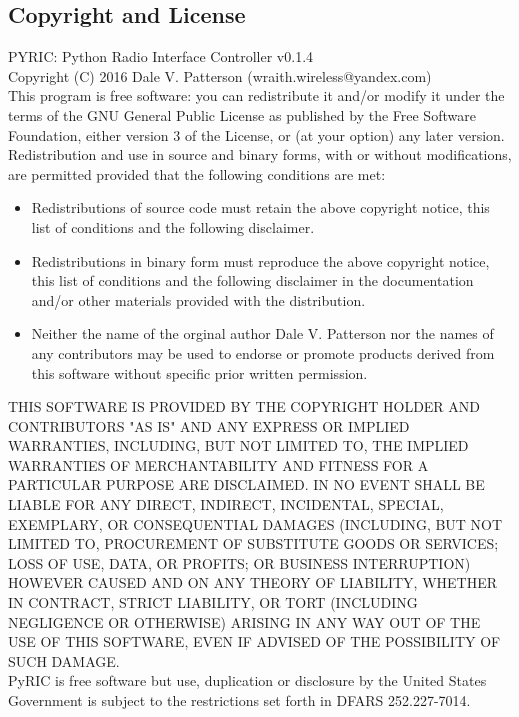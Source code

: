 \documentclass[11pt]{article}
\begin{document}
\begin{appendices}
\section{Copyright and License}\label{sec:copy}
PYRIC: Python Radio Interface Controller v0.1.4\\

Copyright (C) 2016  Dale V. Patterson (wraith.wireless@yandex.com)\\

This program is free software: you can redistribute it and/or modify it under
the terms of the GNU General Public License\cite{gplv3} as published by the Free
Software Foundation, either version 3 of the License, or (at your option) any 
later version.\\

Redistribution and use in source and binary forms, with or without modifications,
are permitted provided that the following conditions are met:
\begin{itemize}
\item Redistributions of source code must retain the above copyright notice, this
list of conditions and the following disclaimer.
\item Redistributions in binary form must reproduce the above copyright notice,
this list of conditions and the following disclaimer in the documentation and/or 
other materials provided with the distribution.
\item Neither the name of the orginal author Dale V. Patterson nor the names of 
any contributors may be used to endorse or promote products derived from this 
software without specific prior written permission.
\end{itemize}

THIS SOFTWARE IS PROVIDED BY THE COPYRIGHT HOLDER AND CONTRIBUTORS "AS IS" AND
ANY EXPRESS OR IMPLIED WARRANTIES, INCLUDING, BUT NOT LIMITED TO, THE IMPLIED
WARRANTIES OF MERCHANTABILITY AND FITNESS FOR A PARTICULAR PURPOSE ARE DISCLAIMED.
IN NO EVENT SHALL BE LIABLE FOR ANY DIRECT, INDIRECT, INCIDENTAL, SPECIAL,
EXEMPLARY, OR CONSEQUENTIAL DAMAGES (INCLUDING, BUT NOT LIMITED TO, PROCUREMENT
OF SUBSTITUTE GOODS OR SERVICES; LOSS OF USE, DATA, OR PROFITS; OR BUSINESS
INTERRUPTION) HOWEVER CAUSED AND ON ANY THEORY OF LIABILITY, WHETHER IN CONTRACT,
STRICT LIABILITY, OR TORT (INCLUDING NEGLIGENCE OR OTHERWISE) ARISING IN ANY WAY
OUT OF THE USE OF THIS SOFTWARE, EVEN IF ADVISED OF THE POSSIBILITY OF SUCH DAMAGE.\\

PyRIC is free software but use, duplication or disclosure by the United States
Government is subject to the restrictions set forth in DFARS 252.227-7014.\\


\end{appendices}
\end{document}

